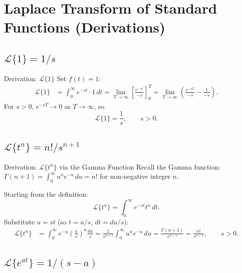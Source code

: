 \documentclass[12pt,a4paper]{article}
\begin{document}
\section{Laplace Transform of Standard Functions (Derivations)}

\subsection{\texorpdfstring{$\mathcal{L}\{1\} = 1/s$}{L{1} = 1/s}}

\begin{infobox}{Derivation: $\mathcal{L}\{1\}$}
Set $f(t) = 1$:
\begin{align*}
\mathcal{L}\{1\} &= \int_0^{\infty} e^{-st}\cdot 1\,dt
  = \lim_{T\to\infty}\left[\frac{e^{-st}}{-s}\right]_0^{T}
  = \lim_{T\to\infty}\left(\frac{e^{-sT}}{-s} - \frac{1}{-s}\right).
\end{align*}
For $s > 0$, $e^{-sT} \to 0$ as $T \to \infty$, so
\[
\mathcal{L}\{1\} = \frac{1}{s}, \qquad s > 0.
\]
\end{infobox}

\subsection{\texorpdfstring{$\mathcal{L}\{t^n\} = n!/s^{n+1}$}{L{t^n} = n!/s^(n+1)}}

\begin{infobox}{Derivation: $\mathcal{L}\{t^n\}$ via the Gamma Function}
Recall the Gamma function: $\Gamma(n+1) = \int_0^{\infty} u^n e^{-u}\,du = n!$ for non-negative integer $n$.

Starting from the definition:
\[
\mathcal{L}\{t^n\} = \int_0^{\infty} e^{-st} t^n\,dt.
\]
Substitute $u = st$ (so $t = u/s$, $dt = du/s$):
\begin{align*}
\mathcal{L}\{t^n\}
  &= \int_0^{\infty} e^{-u} \left(\frac{u}{s}\right)^n \frac{du}{s}
   = \frac{1}{s^{n+1}} \int_0^{\infty} u^n e^{-u}\,du
   = \frac{\Gamma(n+1)}{s^{n+1}}
   = \frac{n!}{s^{n+1}}, \qquad s > 0.
\end{align*}
\end{infobox}

\subsection{\texorpdfstring{$\mathcal{L}\{e^{at}\} = 1/(s-a)$}{L{e^at} = 1/(s-a)}}
\end{document}
